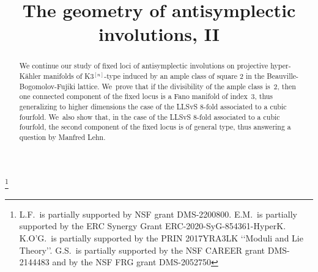 \documentclass[JEP,XML,SOM,Unicode,published]{cedram}
\theoremstyle{definition}
\begin{document}
\frontmatter
\title{The geometry of antisymplectic involutions, II}

\author[\initial{L.} \lastname{Flapan}]{ }
\address{Michigan State University, Department of Mathematics,\\
619 Red Cedar Road, East Lansing, MI 48824, USA}

\author[\initial{E.} \lastname{Macrì}]{ }
\address{Université Paris-Saclay, CNRS, Laboratoire de Mathématiques d'Orsay,\\
Rue Michel Magat, Bât. 307, 91405 Orsay, France}

\author[\initial{K. G.} \lastname{O'Grady}]{  }
\address{Sapienza Università di Roma, Dipartimento di Matematica,\\
P.le A. Moro 5, 00185 Roma, Italia}

\author[\initial{G.} \lastname{Saccà}]{ }
\address{Columbia University, Department of Mathematics,\\
2990 Broadway, New York, NY 10027, USA}

\thanks{L.F.~is partially supported by NSF grant DMS-2200800. E.M.~is partially supported by the ERC Synergy Grant ERC-2020-SyG-854361-HyperK. K.O'G.~is partially supported by the PRIN 2017YRA3LK \lq\lq Moduli and Lie Theory\rq\rq. G.S.~is partially supported by the NSF CAREER grant DMS-2144483 and by the NSF FRG grant DMS-2052750}

\begin{abstract}
We continue our study of fixed loci of antisymplectic involutions on projective hyper-Kähler manifolds of K3$^{[n]}$-type induced by an ample class of square 2 in the Beauville-Bogomolov-Fujiki lattice. We~prove that if the divisibility of the ample class is~2, then one connected component of the fixed locus is a Fano manifold of index~3, thus generalizing to higher dimensions the case of the LLSvS 8-fold associated to a cubic fourfold. We~also show that, in the case of the LLSvS 8-fold associated to a cubic fourfold, the second component of the fixed locus is of general type, thus answering a question by Manfred Lehn.
\end{abstract}
\end{document}
